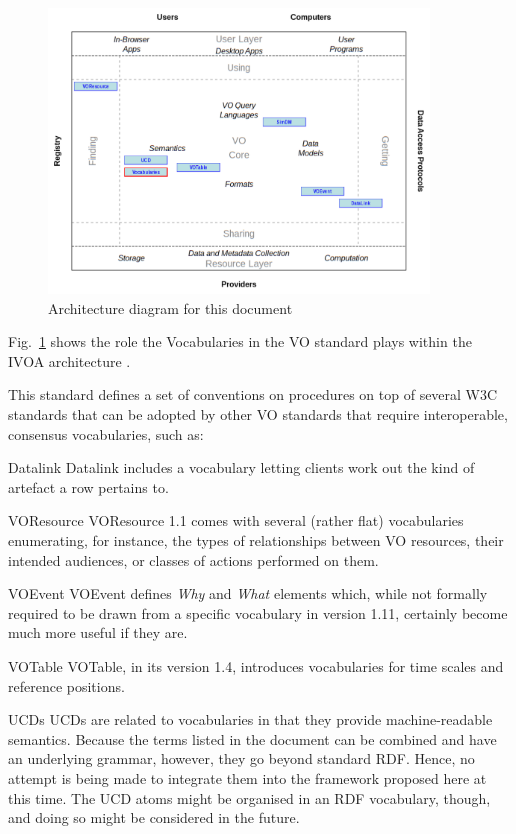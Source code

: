 \documentclass[11pt,a4paper]{ivoa}
\begin{document}
\begin{figure}
\centering

\includegraphics[width=0.9\textwidth]{role_diagram.pdf}
\caption{Architecture diagram for this document}
\label{fig:archdiag}
\end{figure}

Fig.~\ref{fig:archdiag} shows the role the Vocabularies in the VO standard
plays within the IVOA architecture \citep{2010ivoa.rept.1123A}.

This standard defines a set of conventions on procedures on
top of several W3C standards that can be adopted by other VO standards
that require interoperable, consensus vocabularies, such as:

\begin{bigdescription}
\item[Datalink \citep{2015ivoa.spec.0617D}] Datalink includes a
vocabulary letting clients work out the kind of artefact a row pertains
to.

\item[VOResource \citep{2018ivoa.spec.0625P}] VOResource 1.1 comes with
several (rather flat) vocabularies enumerating, for instance, the types
of relationships between VO resources, their intended audiences, or
classes of actions performed on them.

\item[VOEvent \citep{2006ivoa.spec.1101S}] VOEvent defines \emph{Why}
and \emph{What} elements which, while not formally required to be drawn
from a specific vocabulary in version 1.11, certainly become much more
useful if they are.

\item[VOTable \citep{2019ivoa.spec.1021O}] VOTable, in its version 1.4,
introduces vocabularies for time scales and reference positions.


\item[UCDs \citep{2007ivoa.spec.0402M}] UCDs are related to vocabularies in
that they provide machine-readable semantics.  Because the terms listed
in the document can be combined and have an underlying grammar, however,
they go beyond standard RDF.  Hence, no attempt is being made to
integrate them into the framework proposed here at this time.  The
UCD atoms might be organised in an RDF vocabulary, though, and doing so
might be considered in the future.
\end{bigdescription}
\end{document}
